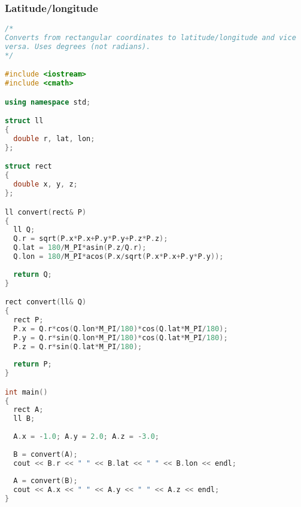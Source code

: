 \subsubsection{Latitude/longitude}
\begin{lstlisting}[language=C++]
/*
Converts from rectangular coordinates to latitude/longitude and vice
versa. Uses degrees (not radians).
*/

#include <iostream>
#include <cmath>

using namespace std;

struct ll
{
  double r, lat, lon;
};

struct rect
{
  double x, y, z;
};

ll convert(rect& P)
{
  ll Q;
  Q.r = sqrt(P.x*P.x+P.y*P.y+P.z*P.z);
  Q.lat = 180/M_PI*asin(P.z/Q.r);
  Q.lon = 180/M_PI*acos(P.x/sqrt(P.x*P.x+P.y*P.y));
  
  return Q;
}

rect convert(ll& Q)
{
  rect P;
  P.x = Q.r*cos(Q.lon*M_PI/180)*cos(Q.lat*M_PI/180);
  P.y = Q.r*sin(Q.lon*M_PI/180)*cos(Q.lat*M_PI/180);
  P.z = Q.r*sin(Q.lat*M_PI/180);
  
  return P;
}

int main()
{
  rect A;
  ll B;
  
  A.x = -1.0; A.y = 2.0; A.z = -3.0;
  
  B = convert(A);
  cout << B.r << " " << B.lat << " " << B.lon << endl;
  
  A = convert(B);
  cout << A.x << " " << A.y << " " << A.z << endl;
}

\end{lstlisting}